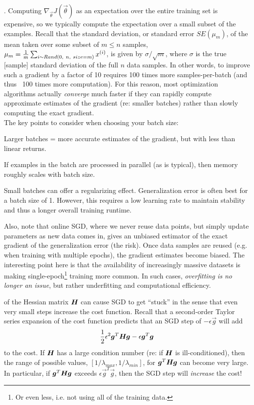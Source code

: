\documentclass[11pt]{article}
\begin{document}
\myspace
\p {}. Computing $\nabla_{\vec \theta} J(\vec \theta)$ as an expectation over the entire training set is expensive, so we typically compute the expectation over a small subset of the examples. Recall that the standard deviation, or standard error $SE(\mu_m)$, of the mean taken over some subset of $m \le n$ samples, $\mu_m = \frac{1}{m} \sum_{i \sim Rand(0,~n,~ size=m)} x^{(i)}$, is given by $\sigma / \sqrt{m}$, where $\sigma$ is the true [sample] standard deviation of the full $n$ data samples. In other words, to improve such a gradient by a factor of 10 requires 100 times more samples-per-batch (and thus ~100 times more computation). For this reason, most optimization algorithms actually \textit{converge} much faster if they can rapidly compute approximate estimates of the gradient (re: smaller batches) rather than slowly computing the exact gradient. \\

\p The key points to consider when choosing your batch size:
\begin{compactenum}
	\item Larger batches = more accurate estimates of the gradient, but with less than linear returns.
	
	\item If examples in the batch are processed in parallel (as is typical), then memory roughly scales with batch size.
	
	\item Small batches can offer a regularizing effect. Generalization error is often best for a batch size of 1. However, this requires a low learning rate to maintain stability and thus a longer overall training runtime. 
\end{compactenum}
Also, note that online SGD, where we never reuse data points, but simply update parameters as new data comes in, gives an unbiased estimator of the exact gradient of the generalization error (the risk). Once data samples are reused (e.g. when training with multiple epochs), the gradient estimates become biased. The interesting point here is that the availability of increasingly massive datasets is making single-epoch\footnote{Or even less, i.e. not using all of the training data.} training more common. In such cases, \textit{overfitting is no longer an issue}, but rather underfitting and computational efficiency. 

\p {} of the Hessian matrix $\bm{H}_{}$ can cause SGD to get ``stuck'' in the sense that even very small steps increase the cost function. Recall that a second-order Taylor series expansion of the cost function predicts that an SGD step of $-\epsilon \vec{g}$ will add 
\begin{align}
	 \frac{1}{2} \epsilon^2 \bm{g}_{}^T \bm{H}_{} \bm{g}_{}  - \epsilon \bm{g}_{}^T\bm{g}_{} \label{delta-sgd}
\end{align}
to the cost. If $\bm{H}_{}$ has a large condition number (re: if $\bm{H}_{}$ is ill-conditioned), then the range of possible values, $[1/\lambda_{max}, 1/\lambda_{min}]$, for $ \bm{g}_{}^T \bm{H}_{} \bm{g}_{} $ can become very large. In particular, if $ \bm{g}_{}^T \bm{H}_{} \bm{g}_{} $ exceeds $\epsilon \vec{g}^T \vec{g}$, then the SGD step will \textit{increase} the cost!
\end{document}

